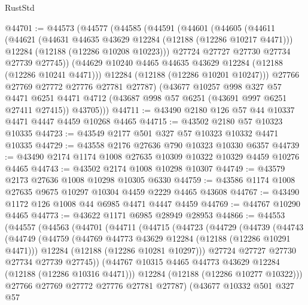 \begin{lexlean}{RustStd}
\begin{coremodule}
@44701 := @44573
    (@44577
      (@44585
        (@44591
          (@44601
            (@44605
              (@44611
                (@44621
                  (@44631 @44635 @43629 @12284 (@12188 (@12286 @10217 @4471)))
                  @12284
                  (@12188 (@12286 @10208 @10223)))
                @27724
                @27727
                @27730
                @27734
                @27739
                @27745))
            (@44629 @10240 @4465 @44635 @43629 @12284 (@12188 (@12286 @10241 @4471)))
            @12284
            (@12188 (@12286 @10201 @10247)))
          @27766
          @27769
          @27772
          @27776
          @27781
          @27787)
        (@43677
          @10257
          @998
          @327
          @57
          @4471
          @6251
          @4471
          @4712
          (@43687 @998 @57 @6251 (@43691 @997 @6251 @27411 @27415))
          @43705)))
@44711 := @43490 @2180 @126 @57 @44 @10337 @4471 @4447 @4459 @10268 @4465
@44715 := @43502 @2180 @57 @10323 @10335
@44723 := @43549 @2177 @501 @327 @57 @10323 @10332 @4471 @10335
@44729 := @43558 @2176 @27636 @790 @10323 @10330 @6357
@44739 := @43490 @2174 @1174 @1008 @27635 @10309 @10322 @10329 @4459 @10276 @4465
@44743 := @43502 @2174 @1008 @10298 @10307
@44749 := @43579 @2173 @27636 @1008 @10298 @10305 @6330
@44759 := @43586 @1174 @1008 @27635 @9675 @10297 @10304 @4459 @2229 @4465 @43608
@44767 := @43490 @1172 @126 @1008 @44 @6985 @4471 @4447 @4459
@44769 := @44767 @10290 @4465
@44773 := @43622 @1171 @6985 @28949 @28953
@44866 := @44553
    (@44557
      (@44563
        (@44701
          (@44711
            (@44715
              (@44723
                (@44729
                  (@44739
                    (@44743
                      (@44749
                        (@44759
                          (@44769 @44773 @43629 @12284 (@12188 (@12286 @10291 @4471)))
                          @12284
                          (@12188 (@12286 @10281 @10297)))
                        @27724
                        @27727
                        @27730
                        @27734
                        @27739
                        @27745))
                    (@44767 @10315 @4465 @44773 @43629 @12284 (@12188 (@12286 @10316 @4471)))
                    @12284
                    (@12188 (@12286 @10277 @10322)))
                  @27766
                  @27769
                  @27772
                  @27776
                  @27781
                  @27787)
                (@43677
                  @10332
                  @501
                  @327
                  @57

\end{coremodule}
\end{lexlean}
